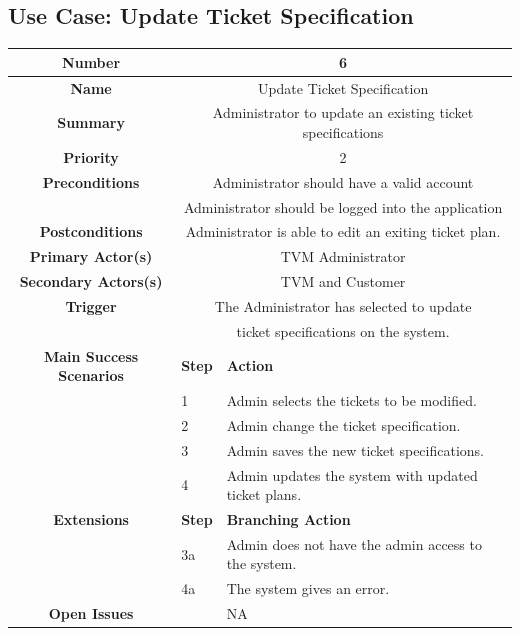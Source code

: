\documentclass[a4paper,12pt]{report}
\begin{document}
\subsection{Use Case: Update Ticket Specification}
\begin{tabular}{ | c | p{2cm} | p{7cm} |}
	
	\hline
	\textbf{Number} & \multicolumn{2}{c|}{6}  \\
	\hline
	\textbf{Name} & \multicolumn{2}{c|}{Update Ticket Specification}  \\
	\hline
	\textbf{Summary} & \multicolumn{2}{c|}{Administrator to update an existing ticket specifications}  \\
	\hline
	\textbf{Priority} & \multicolumn{2}{c|}{2}  \\
	\hline
	\textbf{Preconditions} & \multicolumn{2}{c|}{Administrator should have a valid account}  \\
			  &  \multicolumn{2	}{c|}{Administrator should be logged into the application} \\
	\hline
	\textbf{Postconditions} & \multicolumn{2}{c|}{Administrator is able to edit an exiting ticket plan.}  \\
	\hline
	\textbf{Primary Actor(s)} & \multicolumn{2}{c|}{TVM Administrator}  \\
	\hline
	\textbf{Secondary Actors(s)} & \multicolumn{2}{c|}{TVM and Customer}  \\
	\hline
	\textbf{Trigger} & \multicolumn{2}{c|}{The Administrator has selected to update}  \\
     	&  \multicolumn{2}{c|}{ ticket specifications on the system.} \\
	\hline
	\textbf{Main Success Scenarios} & \textbf{Step} & \textbf{Action} \\
	\hline
	& 1 & Admin selects the tickets to be modified. \\ 
	\hline
	&  2  & Admin change the ticket specification. \\
	\hline
	&  3  & Admin saves the new ticket specifications. \\
	\hline
	&  4  & Admin updates the system with updated ticket plans. \\
	\hline
	
	\textbf{Extensions} & \textbf{Step} & \textbf{Branching Action} \\
	\hline
	&  3a  & Admin does not have the admin access to the system.  \\
	\hline
	&  4a  &  The system gives an error. \\
	\hline
	\textbf{Open Issues} &    & NA \\
	\hline
	
\end{tabular}
\end{document}

